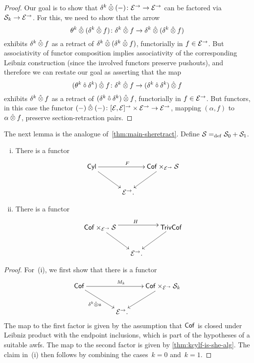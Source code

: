\documentclass[reqno,10pt,a4paper,oneside,draft]{amsart}
\begin{document}
{{\begin{proof}
Our goal is to show that $\delta^k \hatotimes (-) \co \cal{E}^\to \to \cal{E}^\to$ can be factored via $\cal{S}_k \to \cal{E}^\to$.
For this, we need to show
that the arrow
\[
\theta^k \hatotimes (\delta^k \hatotimes f) \co \delta^k \hatotimes f \to \delta^k \hatotimes (\delta^k \hatotimes f)
\]
exhibits $\delta^k \hatotimes f$ as a retract of $\delta^k \hatotimes (\delta^k \hatotimes f)$, functorially in $f \in \cal{E}^\to$.
But associativity of functor composition implies associativity of the corresponding Leibniz construction (since the involved functors preserve pushouts), and therefore we can restate our goal as asserting that the map
\[
(\theta^k \mathbin{\hat{\cc}} \delta^k) \hatotimes f \co \delta^k \hatotimes f \to (\delta^k \mathbin{\hat{\cc}} \delta^k) \hatotimes f
\]
exhibits $\delta^k \hatotimes f$ as a retract of $(\delta^k \mathbin{\hat{\cc}} \delta^k) \hatotimes f$, functorially in $f \in \cal{E}^\to$.
But functors, in this case the functor $(-) \hatotimes (-) \co [\cal{E}, \cal{E}]^\to \times \cal{E}^\to \to \cal{E}^\to$,
mapping $(\alpha, f)$ to $\alpha \hatotimes f$, preserve section-retraction pairs.
\end{proof}

The next lemma is the analogue of~\cref{thm:main-sheretract}.
Define $\cal{S} \defeq  \cal{S}_0 + \cal{S}_1$.

\begin{proposition} \label{thm:strong-hequiv} \leavevmode
\begin{enumerate}[(i)]
\item \label{thm:onedir} There is a functor
\[
\xymatrix@!C@C-2.5em{
  \Cyl
  \ar[dr]
  \ar[rr]^F
&&
  \Cof \times_{\cal{E}^\to} \cal{S}
  \ar[dl]
\\&
  \catE^\to
\rlap{.}}
\]
\item \label{thm:twodir} There is a functor
\[
\xymatrix@!C@C-2.5em{
  \Cof \times_{\cal{E}^\to} \cal{S}
  \ar[dr]
  \ar@<4pt>[rr]^{H}
&&
  \TrivCof
  \ar[dl]
\\&
  \catE^\to
\rlap{.}}
\]
\end{enumerate}
\end{proposition}

\begin{proof}
For~(i), we first show that there is a functor
\[
\xymatrix@!C@C-2em{
  \Cof
  \ar[dr]_{\kcyl \hatotimes u} \ar[rr]^{M_k}
&&
  \Cof \times_{\cal{E}^\to} \cal{S}_k
  \ar[dl]
\\&
   \catE^\to
\rlap{.}}
\]
The map to the first factor is given by the assumption that $\Cof$ is closed under Leibniz product with the endpoint inclusions, which is part of the hypotheses of a suitable awfs.
The map to the second factor is given by \cref{thm:kcylf-is-she-alg}.
The claim in~(i) then follows by combining the cases~$k = 0$ and~$k = 1$.


\end{proof}}}
\end{document}
